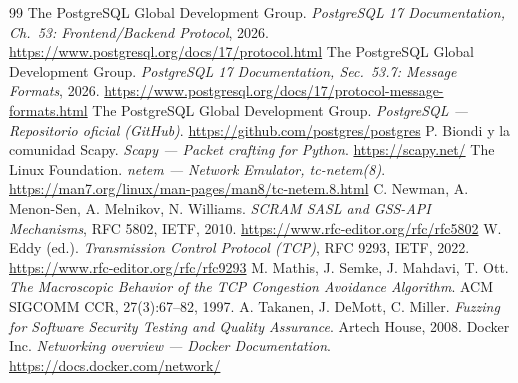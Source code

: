 \documentclass[11pt]{article}
\begin{document}
\begin{thebibliography}{99}
 The PostgreSQL Global Development Group.
  \emph{PostgreSQL 17 Documentation, Ch.~53: Frontend/Backend Protocol}, 2026.
  \url{https://www.postgresql.org/docs/17/protocol.html}
 The PostgreSQL Global Development Group.
  \emph{PostgreSQL 17 Documentation, Sec.~53.7: Message Formats}, 2026.
  \url{https://www.postgresql.org/docs/17/protocol-message-formats.html}
 The PostgreSQL Global Development Group.
  \emph{PostgreSQL --- Repositorio oficial (GitHub)}.
  \url{https://github.com/postgres/postgres}
 P. Biondi y la comunidad Scapy.
  \emph{Scapy --- Packet crafting for Python}. \url{https://scapy.net/}
 The Linux Foundation. \emph{netem --- Network Emulator,
  tc-netem(8)}. \url{https://man7.org/linux/man-pages/man8/tc-netem.8.html}
 C. Newman, A. Menon-Sen, A. Melnikov, N. Williams.
  \emph{SCRAM SASL and GSS-API Mechanisms}, RFC 5802, IETF, 2010.
  \url{https://www.rfc-editor.org/rfc/rfc5802}
 W. Eddy (ed.). \emph{Transmission Control Protocol (TCP)},
  RFC 9293, IETF, 2022. \url{https://www.rfc-editor.org/rfc/rfc9293}
 M. Mathis, J. Semke, J. Mahdavi, T. Ott.
  \emph{The Macroscopic Behavior of the TCP Congestion Avoidance Algorithm}.
  ACM SIGCOMM CCR, 27(3):67--82, 1997.
 A. Takanen, J. DeMott, C. Miller.
  \emph{Fuzzing for Software Security Testing and Quality Assurance}.
  Artech House, 2008.
 Docker Inc. \emph{Networking overview --- Docker
  Documentation}. \url{https://docs.docker.com/network/}
\end{thebibliography}
\end{document}
